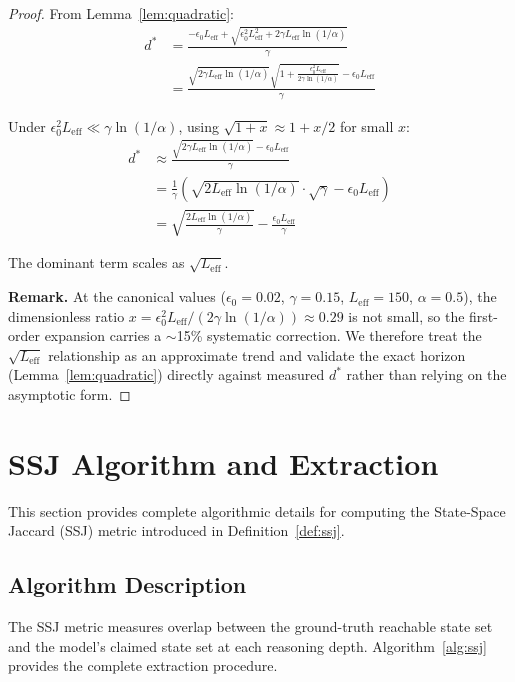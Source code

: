 \documentclass{article}
\theoremstyle{plain}
\theoremstyle{definition}
\theoremstyle{remark}
\newcommand{\Leff}{L_{\mathrm{eff}}}
\begin{document}
\begin{proof}
From Lemma~\ref{lem:quadratic}:
\begin{align}
d^* &= \frac{-\epsilon_0 \Leff + \sqrt{\epsilon_0^2 \Leff^2 + 2\gamma \Leff \ln(1/\alpha)}}{\gamma} \\
&= \frac{\sqrt{2\gamma \Leff \ln(1/\alpha)}\sqrt{1 + \frac{\epsilon_0^2 \Leff}{2\gamma \ln(1/\alpha)}} - \epsilon_0 \Leff}{\gamma}
\end{align}

Under $\epsilon_0^2 \Leff \ll \gamma \ln(1/\alpha)$, using $\sqrt{1+x} \approx 1 + x/2$ for small $x$:
\begin{align}
d^* &\approx \frac{\sqrt{2\gamma \Leff \ln(1/\alpha)} - \epsilon_0 \Leff}{\gamma} \\
&= \frac{1}{\gamma}\left(\sqrt{2\Leff \ln(1/\alpha)} \cdot \sqrt{\gamma} - \epsilon_0 \Leff\right) \\
&= \sqrt{\frac{2\Leff \ln(1/\alpha)}{\gamma}} - \frac{\epsilon_0 \Leff}{\gamma}
\end{align}

The dominant term scales as $\sqrt{\Leff}$.

\textbf{Remark.} At the canonical values ($\epsilon_0 = 0.02$, $\gamma = 0.15$, $\Leff = 150$, $\alpha = 0.5$), the dimensionless ratio $x = \epsilon_0^2 \Leff / (2\gamma \ln(1/\alpha)) \approx 0.29$ is not small, so the first-order expansion carries a $\sim$15\% systematic correction. We therefore treat the $\sqrt{\Leff}$ relationship as an approximate trend and validate the exact horizon (Lemma~\ref{lem:quadratic}) directly against measured $d^*$ rather than relying on the asymptotic form.
\end{proof}


\section{SSJ Algorithm and Extraction}
\label{app:ssj_ext}

This section provides complete algorithmic details for computing the State-Space Jaccard (SSJ) metric introduced in Definition~\ref{def:ssj}.

\subsection{Algorithm Description}

The SSJ metric measures overlap between the ground-truth reachable state set and the model's claimed state set at each reasoning depth. Algorithm~\ref{alg:ssj} provides the complete extraction procedure.
\end{document}
